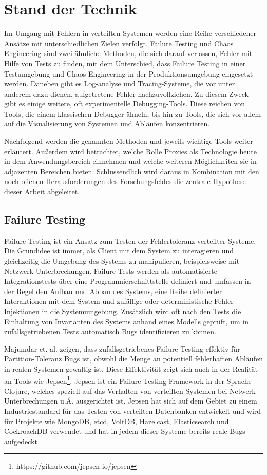 \documentclass[12pt,a4paper]{report}
\begin{document}
\chapter{Stand der Technik}
Im Umgang mit Fehlern in verteilten Systemen werden eine Reihe verschiedener Ansätze mit unterschiedlichen Zielen verfolgt.
Failure Testing und Chaos Engineering sind zwei ähnliche Methoden, die sich darauf verlassen, Fehler mit Hilfe von Tests zu
finden, mit dem Unterschied, dass Failure Testing in einer Testumgebung und Chaos Engineering in der Produktionsumgebung
eingesetzt werden. Daneben gibt es Log-analyse und Tracing-Systeme, die vor unter anderem dazu dienen, aufgetretene Fehler
nachzuvollziehen. Zu diesem Zweck gibt es einige weitere, oft experimentelle Debugging-Tools. Diese reichen von Tools, die einem
klassischen Debugger ähneln, bis hin zu Tools, die sich vor allem auf die Visualisierung von Systemen und Abläufen konzentrieren.
\cite{challenges_and_options}

Nachfolgend werden die genannten Methoden und jeweils wichtige Tools weiter erläutert. Außerdem wird betrachtet, welche Rolle
Proxies als Technologie heute in dem Anwendungsbereich einnehmen und welche weiteren Möglichkeiten sie in adjazenten Bereichen
bieten. Schlussendlich wird daraus in Kombination mit den noch offenen Herausforderungen des Forschungsfeldes die zentrale
Hypothese dieser Arbeit abgeleitet.

\section{Failure Testing}
Failure Testing ist ein Ansatz zum Testen der Fehlertoleranz verteilter Systeme. Die Grundidee ist immer, als Client mit dem
System zu interagieren und gleichzeitig die Umgebung des Systems zu manipulieren, beispielsweise mit Netzwerk-Unterbrechungen.
Failure Tests werden als automatisierte Integrationstests über eine Programmierschnittstelle definiert und umfassen in der Regel den Aufbau
und Abbau des Systems, eine Reihe definierter Interaktionen mit dem System und zufällige oder deterministische Fehler-Injektionen
in die Systemumgebung. Zusätzlich wird oft nach den Tests die Einhaltung von Invarianten des Systems anhand eines Modells geprüft, um
in zufallsgetriebenen Tests automatisch Bugs identifizieren zu können. \cite{failify_masters_thesis}

Majumdar et. al. \cite{why_is_random_testing_effective} zeigen, dass zufallsgetriebenes Failure-Testing effektiv für
Partition-Toleranz Bugs ist, obwohl die Menge an potentiell fehlerhaften Abläufen in realen Systemen gewaltig ist. Diese
Effektivität zeigt sich auch in der Realität an Tools wie Jepsen\footnote{https://github.com/jepsen-io/jepsen}. Jepsen ist ein
Failure-Testing-Framework in der Sprache Clojure, welches speziell auf das Verhalten von verteilten Systemen bei
Netwerk-Unterbrechungen u.Ä. ausgerichtet ist. Jepsen hat sich auf dem Gebiet zu einem Industriestandard für das Testen von
verteilten Datenbanken entwickelt \cite{abstracting_the_geniuses} und wird für Projekte wie MongoDB, etcd, VoltDB, Hazelcast,
Elasticsearch und CockroachDB verwendet und hat in jedem dieser Systeme bereits reale Bugs aufgedeckt \cite{jepsen_analyses}.
\end{document}
